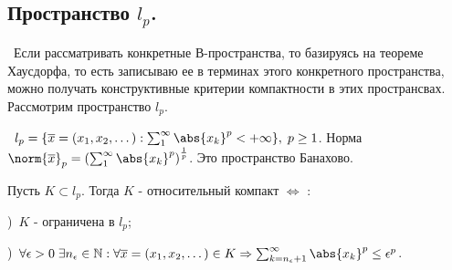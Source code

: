 \subsection*{Пространство $l_p$.}

\noindent\checkmark~Если рассматривать конкретные В-пространства, то базируясь на теореме Хаусдорфа, то есть записываю ее в терминах этого конкретного пространства, 
можно получать конструктивные критерии компактности в этих пространсвах. Рассмотрим пространство $l_p$.

\smallskip 
\noindent\textbullet~$l_p = \{ \overline{x} = (x_1, x_2, \dots) : \sum_1^\infty \abs{x_k}^p < +\infty\}, \; p \ge 1$. Норма $\norm{\overline{x}}_p = \left( \sum_1^\infty 
\abs{x_k}^p\right)^\frac{1}{p}$. Это пространство Банахово. 

\begin{theorem*}
Пусть $K \subset l_p$. Тогда $K$ - относительный компакт $\Longleftrightarrow$ :

)~$K$ - ограничена в  $l_p$;

)~$\forall \epsilon > 0 \; \exists n_\epsilon \in \mathbb{N} : \forall \overline{x} = (x_1, x_2, \dots) \in K \Rightarrow \sum_{k = n_\epsilon + 1}^\infty \abs{x_k}^p \le 
\epsilon^p$.

\end{theorem*}

